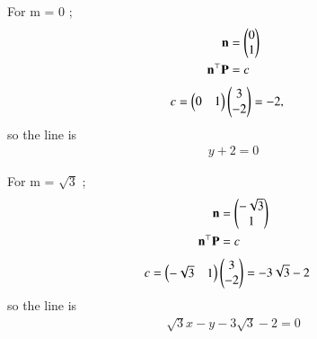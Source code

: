 \documentclass[journal]{IEEEtran}
\begin{document}
For m = 0 ;
\begin{align}
    \mathbf{n} &= \begin{pmatrix}0\\1\end{pmatrix}\\
    \mathbf{n}^\top \mathbf{P} &= c
\end{align}
\begin{align}
    c = \begin{pmatrix}0&1\end{pmatrix}\begin{pmatrix}3\\-2\end{pmatrix}&=-2,
\end{align}
so the line is
\begin{align}
    y+2=0
\end{align}

For m = $\sqrt{3}$ ;
\begin{align}
\mathbf{n} &= \begin{pmatrix}-\sqrt{3}\\1\end{pmatrix}\\
\mathbf{n}^\top \mathbf{P} &= c
\end{align}
\begin{align}
    c = \begin{pmatrix}-\sqrt{3}&1\end{pmatrix}\begin{pmatrix}3\\-2\end{pmatrix} &= -3\sqrt{3}-2
\end{align}
so the line is
\begin{align}
     \sqrt{3}x - y - 3\sqrt{3}-2 = 0
\end{align}
\end{document}
